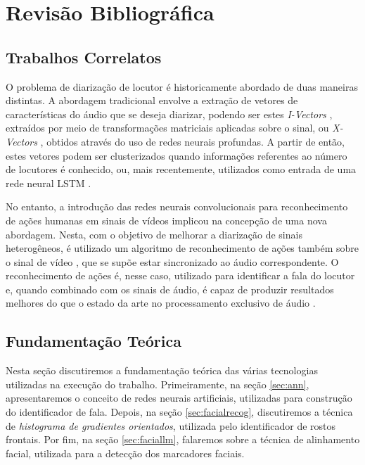 \chapter{Revisão Bibliográfica}

\section{Trabalhos Correlatos}
\label{sec:related-work}

O problema de diarização de locutor é historicamente abordado de duas maneiras distintas.
A abordagem tradicional envolve a extração de vetores de características do áudio que se deseja diarizar, podendo ser estes \textit{I-Vectors} \cite{dehakFrontEndFactorAnalysis2011}, extraídos por meio de transformações matriciais aplicadas sobre o sinal, ou \textit{X-Vectors} \cite{snyderXVectorsRobustDNN2018}, obtidos através do uso de redes neurais profundas.
A partir de então, estes vetores podem ser clusterizados \cite{sellSpeakerDiarizationPlda2014} quando informações referentes ao número de locutores é conhecido, ou, mais recentemente, utilizados como entrada de uma rede neural LSTM \cite{wangSpeakerDiarizationLSTM2018}.

No entanto, a introdução das redes neurais convolucionais para reconhecimento de ações humanas em sinais de vídeos \cite{ji3DConvolutionalNeural2013, karpathyLargeScaleVideoClassification2014} implicou na concepção de uma nova abordagem.
Nesta, com o objetivo de melhorar a diarização de sinais heterogêneos, é utilizado um algoritmo de reconhecimento de ações também sobre o sinal de vídeo \cite{hersheyAudiovisualGraphicalModels2004}, que se supõe estar sincronizado ao áudio correspondente.
O reconhecimento de ações é, nesse caso, utilizado para identificar a fala do locutor e, quando combinado com os sinais de áudio, é capaz de produzir resultados melhores do que o estado da arte no processamento exclusivo de áudio \cite{ephratLookingListenCocktail2018}.

\section{Fundamentação Teórica}

Nesta seção discutiremos a fundamentação teórica das várias tecnologias utilizadas na execução do trabalho. Primeiramente, na seção \ref{sec:ann}, apresentaremos o conceito de redes neurais artificiais, utilizadas para construção do identificador de fala. Depois, na seção \ref{sec:facialrecog}, discutiremos a técnica de \textit{histograma de gradientes orientados}, utilizada pelo identificador de rostos frontais. Por fim, na seção \ref{sec:faciallm}, falaremos sobre a técnica de alinhamento facial, utilizada para a detecção dos marcadores faciais.

